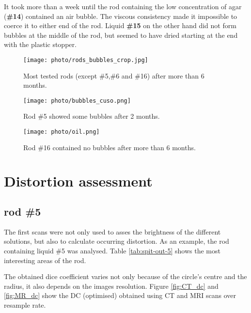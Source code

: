 It took more than a week until the rod containing the low concentration of agar (\textbf{\#14}) contained an air bubble.
The viscous consistency made it impossible to coerce it to either end of the rod.
Liquid \textbf{\#15} on the other hand did not form bubbles at the middle of the rod, but seemed to have dried starting at the end with the plastic stopper.

\begin{figure}[tbh!]
\centering
\texttt{[image: photo/rods\_bubbles\_crop.jpg]}
\caption{Most tested rods (except \#5,\#6 and \#16) after more than 6 months.}
\label{fig:bubbles}
\end{figure}


\begin{figure}[tbh!]
\centering
\texttt{[image: photo/bubbles\_cuso.png]}
\caption{Rod \#5 showed some bubbles after 2 months.}
\label{fig:bubbles_cuso}
\end{figure}

\begin{figure}[tbh!]
\centering
\texttt{[image: photo/oil.png]}
\caption{Rod \#16 contained no bubbles after more than 6 months.}
\label{fig:bubbles_oil}
\end{figure}

\section{Distortion assessment}

\subsection{rod \#5}

The first scans were not only used to asses the brightness of the different solutions, but also to calculate occurring distortion.
As an example, the rod containing liquid \#5 was analysed.
Table \ref{tab:spit-out-5} shows the most interesting areas of the rod.


The obtained dice coefficient varies not only because of the circle's centre and the radius, it also depends on the images resolution.
Figure \ref{fig:CT_dc} and \ref{fig:MR_dc} show the DC (optimised) obtained using CT and MRI scans over resample rate.

